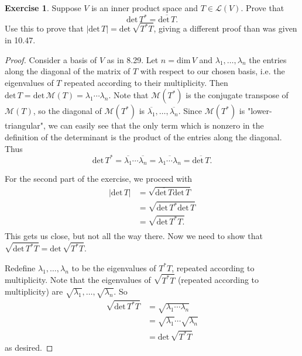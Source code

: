 \documentclass{article}
\theoremstyle{definition}
\newtheorem{ex}{Exercise}
\begin{document}
\begin{ex}
	Suppose $V$ is an inner product space and $T \in \mathcal{L}(V)$.
	Prove that \begin{equation*}
		\mathrm{det}\,T^* = \overline{\mathrm{det}\,T}.
	\end{equation*}
	Use this to prove that $|\mathrm{det}\,T| = \mathrm{det}\,\sqrt{T^*T}$, giving a different proof than was given in 10.47.
\end{ex}
\begin{proof}
	Consider a basis of $V$ as in 8.29.
	Let $n = \mathrm{dim}\,V$ and $\lambda_1, \dots, \lambda_n$ the entries along the diagonal of the matrix of $T$ with respect to our chosen basis, i.e. the eigenvalues of $T$ repeated according to their multiplicity.
	Then $\mathrm{det}\,T = \mathrm{det}\,\mathcal{M}(T) = \lambda_1 \cdots \lambda_n$.
	Note that $\mathcal{M}(T^*)$ is the conjugate transpose of $\mathcal{M}(T)$, so the diagonal of $\mathcal{M}(T^*)$ is $\overline{\lambda_1}, \dots, \overline{\lambda_n}$.
	Since $\mathcal{M}(T^*)$ is "lower-triangular", we can easily see that the only term which is nonzero in the definition of the determinant is the product of the entries along the diagonal.
	Thus \begin{equation*}
		\mathrm{det}\,T^* = \overline{\lambda_1} \cdots \overline{\lambda_n} = \overline{\lambda_1 \cdots \lambda_n} = \overline{\mathrm{det}\,T}.
	\end{equation*}

	For the second part of the exercise, we proceed with \begin{align*}
		|\mathrm{det}\,T| & = \sqrt{\overline{\mathrm{det}\,T}\mathrm{det}\,T} \\
		                  & = \sqrt{\mathrm{det}\,T^* \mathrm{det}\,T}         \\
		                  & = \sqrt{\mathrm{det}\,T^*T.} \tag{1}               \\
	\end{align*}
	This gets us close, but not all the way there.
	Now we need to show that $\sqrt{\mathrm{det}\,T^*T} = \mathrm{det}\,\sqrt{T^*T}$.

	Redefine $\lambda_1, \dots, \lambda_n$ to be the eigenvalues of $T^*T$, repeated according to multiplicity.
	Note that the eigenvalues of $\sqrt{T^*T}$ (repeated according to multiplicity) are $\sqrt{\lambda_1}, \dots, \sqrt{\lambda_n}$.
	So \begin{align*}
		\sqrt{\mathrm{det}\,T^*T} & = \sqrt{\lambda_1 \cdots \lambda_n}      \\
		                          & = \sqrt{\lambda_1}\cdots\sqrt{\lambda_n} \\
		                          & = \mathrm{det}\,\sqrt{T^*T}
	\end{align*}
  as desired.
\end{proof}
\end{document}
